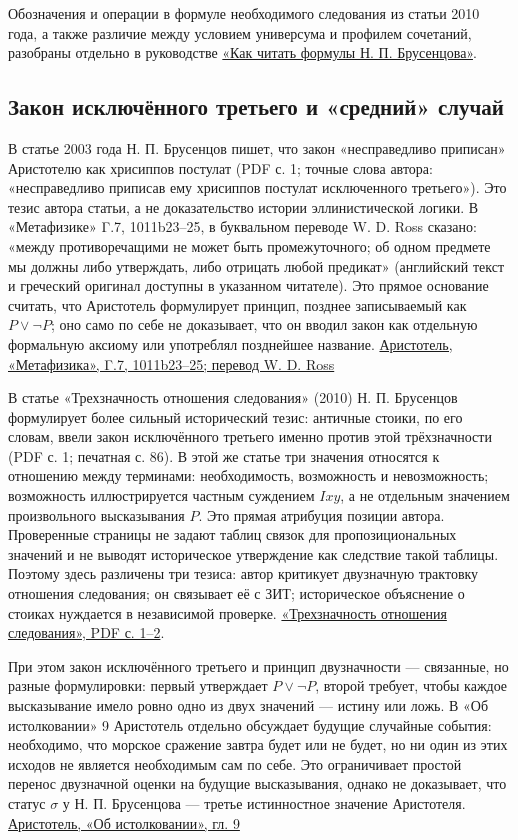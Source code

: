 \documentclass[12pt,a4paper]{article}
\begin{document}
Обозначения и операции в формуле необходимого следования из статьи 2010 года, а также различие между условием универсума и профилем сочетаний, разобраны отдельно в руководстве \href{Как-читать-формулы-Брусенцова.tex}{«Как читать формулы Н. П. Брусенцова»}.

\subsection{Закон исключённого третьего и «средний» случай}

В статье 2003 года Н. П. Брусенцов пишет, что закон «несправедливо приписан» Аристотелю как хрисиппов постулат (PDF с. 1; точные слова автора: «несправедливо приписав ему хрисиппов постулат исключенного третьего»). Это тезис автора статьи, а не доказательство истории эллинистической логики. В «Метафизике» Γ.7, 1011b23–25, в буквальном переводе W. D. Ross сказано: «между противоречащими не может быть промежуточного; об одном предмете мы должны либо утверждать, либо отрицать любой предикат» (английский текст и греческий оригинал доступны в указанном читателе). Это прямое основание считать, что Аристотель формулирует принцип, позднее записываемый как \(P\lor\neg P\); оно само по себе не доказывает, что он вводил закон как отдельную формальную аксиому или употреблял позднейшее название. \href{https://aristotle.johnhboyer.com/Meta/book/4/}{Аристотель, «Метафизика», Γ.7, 1011b23–25; перевод W. D. Ross}

В статье «Трехзначность отношения следования» (2010) Н. П. Брусенцов формулирует более сильный исторический тезис: античные стоики, по его словам, ввели закон исключённого третьего именно против этой трёхзначности (PDF с. 1; печатная с. 86). В этой же статье три значения относятся к отношению между терминами: необходимость, возможность и невозможность; возможность иллюстрируется частным суждением \(Ixy\), а не отдельным значением произвольного высказывания \(P\). Это прямая атрибуция позиции автора. Проверенные страницы не задают таблиц связок для пропозициональных значений и не выводят историческое утверждение как следствие такой таблицы. Поэтому здесь различены три тезиса: автор критикует двузначную трактовку отношения следования; он связывает её с ЗИТ; историческое объяснение о стоиках нуждается в независимой проверке. \href{../sources/pdfs/Брусенцов_Трехзначность-отношения-следования_2010.pdf}{«Трехзначность отношения следования», PDF с. 1–2}.

При этом закон исключённого третьего и принцип двузначности — связанные, но разные формулировки: первый утверждает \(P\lor\neg P\), второй требует, чтобы каждое высказывание имело ровно одно из двух значений — истину или ложь. В «Об истолковании» 9 Аристотель отдельно обсуждает будущие случайные события: необходимо, что морское сражение завтра будет или не будет, но ни один из этих исходов не является необходимым сам по себе. Это ограничивает простой перенос двузначной оценки на будущие высказывания, однако не доказывает, что статус \(\sigma\) у Н. П. Брусенцова — третье истинностное значение Аристотеля. \href{https://www.st-andrews.ac.uk/~mnat/~ball0888/salamis/interpretatione.html}{Аристотель, «Об истолковании», гл. 9}
\end{document}
